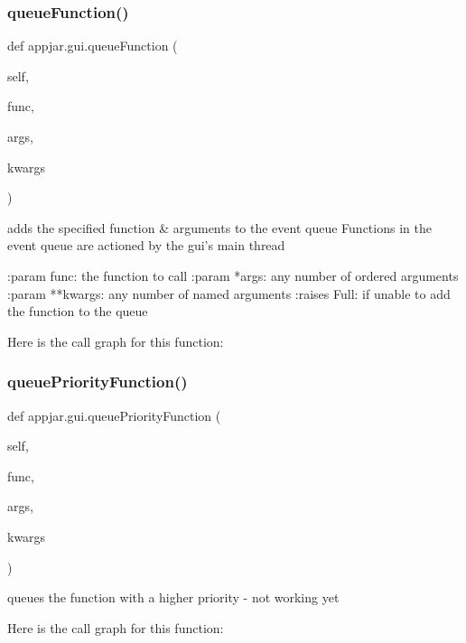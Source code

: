 \begin{DoxyVerb}
\subsubsection{\texorpdfstring{queue\+Function()}{queueFunction()}}
{\footnotesize\ttfamily def appjar.\+gui.\+queue\+Function (\begin{DoxyParamCaption}\item[{}]{self,  }\item[{}]{func,  }\item[{}]{args,  }\item[{}]{kwargs }\end{DoxyParamCaption})}

\begin{DoxyVerb}adds the specified function & arguments to the event queue
Functions in the event queue are actioned by the gui's main thread

:param func: the function to call
:param *args: any number of ordered arguments
:param **kwargs: any number of named arguments
:raises Full: if unable to add the function to the queue
\end{DoxyVerb}
 Here is the call graph for this function\+:
\mbox{\label{classappjar_1_1gui_aed55cb246e9cf47f4763d72bb46b5266}} 
\subsubsection{\texorpdfstring{queue\+Priority\+Function()}{queuePriorityFunction()}}
{\footnotesize\ttfamily def appjar.\+gui.\+queue\+Priority\+Function (\begin{DoxyParamCaption}\item[{}]{self,  }\item[{}]{func,  }\item[{}]{args,  }\item[{}]{kwargs }\end{DoxyParamCaption})}

\begin{DoxyVerb}queues the function with a higher priority - not working yet \end{DoxyVerb}
 Here is the call graph for this function\+:
\mbox{\label{classappjar_1_1gui_af5cc0fdb337b9cccf09708697e0e4640}} 

\end{DoxyVerb}

